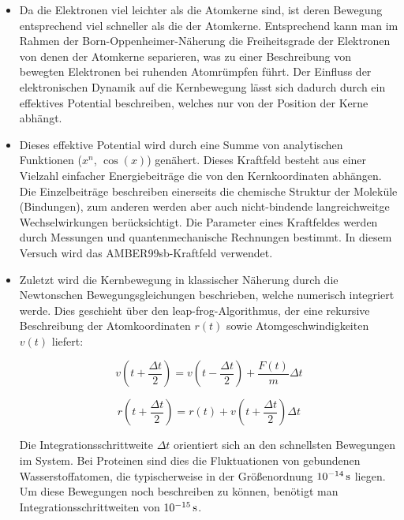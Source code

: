 \documentclass[a4paper,12pt]{article}
\begin{document}
\begin{itemize}
    \item Da die Elektronen viel leichter als die Atomkerne sind, ist deren Bewegung
          entsprechend viel schneller als die der Atomkerne. Entsprechend kann man im Rahmen der
          Born-Oppenheimer-N\"aherung die Freiheitsgrade der Elektronen von denen der
          Atomkerne separieren, was zu einer Beschreibung von bewegten Elektronen bei
          ruhenden Atomr\"umpfen f\"uhrt. Der Einfluss der elektronischen Dynamik auf die
          Kernbewegung l\"asst sich dadurch durch ein
          effektives Potential beschreiben, welches nur von der Position der Kerne abh\"angt.
    \item Dieses effektive Potential wird durch eine Summe von analytischen Funktionen
          ($x^n$, $\cos(x)$) gen\"ahert. Dieses Kraftfeld
          besteht aus einer Vielzahl einfacher Energiebeitr\"age die von den Kernkoordinaten
          abh\"angen. Die Einzelbeitr\"age beschreiben einerseits die chemische Struktur der
          Molek\"ule (Bindungen), zum anderen werden aber auch nicht-bindende
          langreichweitge Wechselwirkungen ber\"ucksichtigt. Die Parameter eines Kraftfeldes
          werden durch Messungen und quantenmechanische Rechnungen bestimmt.
          In diesem Versuch wird das AMBER99sb-Kraftfeld verwendet.
    \item Zuletzt wird die  Kernbewegung in klassischer N\"aherung durch die
          Newtonschen Bewegungsgleichungen beschrieben, welche numerisch integriert werde.
          Dies geschieht \"uber
          den leap-frog-Algorithmus, der eine rekursive Beschreibung der
          Atomkoordinaten $r(t)$ sowie Atomgeschwindigkeiten $v(t)$ liefert:

          \[ v\left(t+\frac{\Delta t}{2}\right)=v\left(t-\frac{\Delta t}{2}\right)+\frac{F(t)}{m}\Delta t \]
          
          \[ r\left(t+\frac{\Delta t}{2}\right)=r(t)+v\left(t+\frac{\Delta t}{2}\right)\Delta t \]

          Die Integrationsschrittweite $\Delta t$ orientiert sich an den schnellsten
          Bewegungen im System. Bei Proteinen sind dies die Fluktuationen von gebundenen
          Wasserstoffatomen, die typischerweise in der Gr\"o\ss enordnung $10^{-14}\,{\rm s}$
          liegen. Um diese Bewegungen noch beschreiben zu k\"onnen, ben\"otigt man
          Integrationsschrittweiten von $10^{-15}\,{\rm s}$.
\end{itemize}
\end{document}
